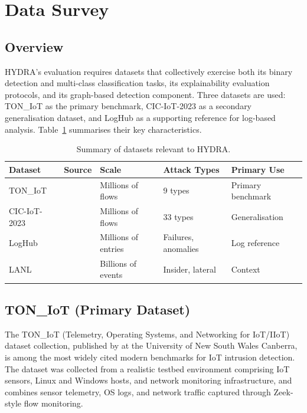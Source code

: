 \documentclass[12pt,a4paper]{report}
\begin{document}
\section{Data Survey}
\label{sec:datasurvey}

\subsection{Overview}
\label{sec:data-overview}

HYDRA's evaluation requires datasets that collectively exercise both its binary detection and multi-class classification tasks, its explainability evaluation protocols, and its graph-based detection component. Three datasets are used: TON\_IoT as the primary benchmark, CIC-IoT-2023 as a secondary generalisation dataset, and LogHub as a supporting reference for log-based analysis. Table~\ref{tab:datasets} summarises their key characteristics.

\begin{table}[H]
\centering
\caption{Summary of datasets relevant to HYDRA.}
\label{tab:datasets}
\begin{tabular}{lllll}
\toprule
\textbf{Dataset} & \textbf{Source} & \textbf{Scale} & \textbf{Attack Types} & \textbf{Primary Use} \\
\midrule
TON\_IoT & \citet{moustafa2021} & Millions of flows & 9 types & Primary benchmark \\
CIC-IoT-2023 & \citet{cic2023} & Millions of flows & 33 types & Generalisation \\
LogHub & \citet{zhu2023} & Millions of entries & Failures, anomalies & Log reference \\
LANL & \citet{turcotte2017} & Billions of events & Insider, lateral & Context \\
\bottomrule
\end{tabular}
\end{table}

\subsection{TON\_IoT (Primary Dataset)}
\label{sec:toniot}

The TON\_IoT (Telemetry, Operating Systems, and Networking for IoT/IIoT) dataset collection, published by \citet{moustafa2021} at the University of New South Wales Canberra, is among the most widely cited modern benchmarks for IoT intrusion detection. The dataset was collected from a realistic testbed environment comprising IoT sensors, Linux and Windows hosts, and network monitoring infrastructure, and combines sensor telemetry, OS logs, and network traffic captured through Zeek-style flow monitoring.
\end{document}
